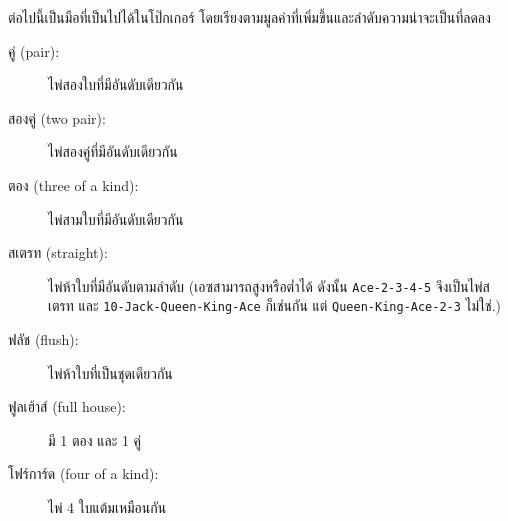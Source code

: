 \begin{exercise}
\label{poker}


ต่อไปนี้เป็นมือที่เป็นไปได้ในโป๊กเกอร์ โดยเรียงตามมูลค่าที่เพิ่มขึ้นและลำดับความน่าจะเป็นที่ลดลง

\begin{description}

\item[คู่ (pair):] ไพ่สองใบที่มีอันดับเดียวกัน
\vspace{-0.05in}

\item[สองคู่ (two pair):] ไพ่สองคู่ที่มีอันดับเดียวกัน
\vspace{-0.05in}

\item[ตอง (three of a kind):] ไพ่สามใบที่มีอันดับเดียวกัน
\vspace{-0.05in}

\item[สเตรท (straight):] ไพ่ห้าใบที่มีอันดับตามลำดับ (เอซสามารถสูงหรือต่ำได้ ดังนั้น {\tt Ace-2-3-4-5} จึงเป็นไพ่สเตรท 
และ {\tt 10-Jack-Queen-King-Ace} ก็เช่นกัน แต่ {\tt Queen-King-Ace-2-3} ไม่ใช่.)
\vspace{-0.05in}

\item[ฟลัช (flush):] ไพ่ห้าใบที่เป็นชุดเดียวกัน
\vspace{-0.05in}

\item[ฟูลเฮ้าส์ (full house):] มี 1 ตอง และ 1 คู่
\vspace{-0.05in}

\item[โฟร์การ์ด (four of a kind):] ไพ่ 4 ใบแต้มเหมือนกัน
\vspace{-0.05in}


\end{description}
\end{exercise}
